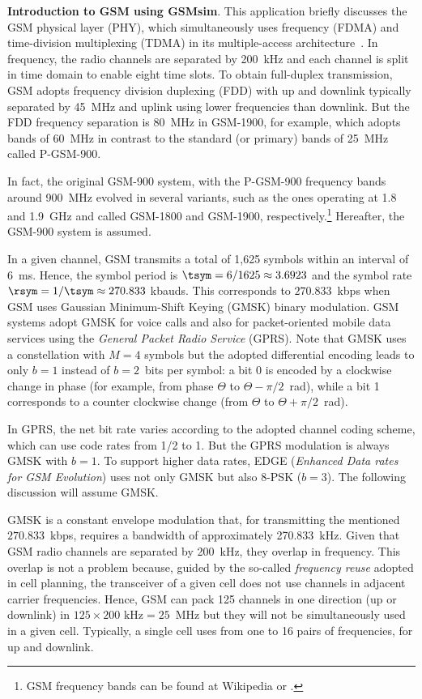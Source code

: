 \bApplication \textbf{Introduction to GSM using GSMsim}.
\label{app:GSMsim}
This application briefly discusses the GSM physical layer (PHY), which
simultaneously uses frequency (FDMA) and time-division multiplexing (TDMA) in
its multiple-access architecture~\cite{Yacoub02}. In frequency,
the radio channels are separated by 200~kHz and each channel is
split in time domain to enable eight time slots. To obtain full-duplex transmission,
GSM adopts frequency division duplexing (FDD) with up and downlink typically separated
by 45~MHz and uplink using lower frequencies than downlink. But the FDD frequency
separation is 80~MHz in GSM-1900, for example, which adopts bands of 60~MHz
in contrast to the standard (or primary) bands of 25~MHz called P-GSM-900.

In fact, the original GSM-900 system, with the P-GSM-900 frequency bands around 900~MHz evolved
in several variants, such as the ones operating at 1.8 and 1.9~GHz and called GSM-1800 and 
GSM-1900, respectively.\footnote{GSM frequency bands can be found at Wikipedia or .} Hereafter, the GSM-900 system is assumed.

In a given channel, GSM transmits a total of 1,625 symbols within an interval of 6~ms. Hence, the symbol period is $\tsym = 6/1625 \approx 3.6923$ {\mus} and the symbol rate $\rsym=1/\tsym \approx 270.833$ kbauds. This corresponds to $270.833$~kbps when GSM uses Gaussian Minimum-Shift Keying (GMSK) binary modulation. GSM systems adopt GMSK for voice calls
and also for packet-oriented mobile data services using 
the \emph{General Packet Radio Service} (GPRS). 
Note that GMSK uses a constellation with $M=4$ symbols but the adopted
differential encoding leads to only $b=1$ instead of $b=2$~bits per symbol: a bit 0 is encoded by
a clockwise change in phase (for example, from phase $\Theta$ to $\Theta-\pi/2$~rad), 
while a bit 1 corresponds to a counter clockwise change (from $\Theta$ to $\Theta+\pi/2$~rad).

In GPRS, the net bit rate varies according to the adopted channel coding scheme, which 
can use code rates from 1/2 to 1. But the GPRS modulation is always GMSK with $b=1$.
To support higher data rates, EDGE (\emph{Enhanced Data rates for GSM Evolution})
uses not only GMSK but also 8-PSK ($b=3$). The following discussion will assume GMSK.

GMSK is a constant envelope modulation that, for transmitting the mentioned $270.833$~kbps,
requires a  bandwidth of approximately 270.833~kHz.
Given that GSM radio channels are separated by 200~kHz, they overlap in frequency.
This overlap is not a problem
because, guided by the so-called \emph{frequency reuse} adopted in cell planning, 
the transceiver of a given cell does not use channels in adjacent carrier frequencies.
Hence, GSM can pack 125 channels in one direction (up or downlink) 
in $125 \times 200 \textrm{~kHz} = 25$~MHz but they will not be simultaneously used in a given cell. 
Typically, a single cell uses from one to 16 pairs of frequencies, for up and downlink.

